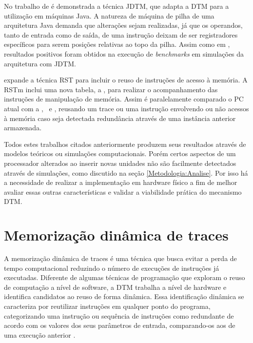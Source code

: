 No trabalho de  é demonstrada a técnica JDTM, que adapta a DTM para a utilização em máquinas Java. A natureza de máquina de pilha de uma arquitetura Java demanda que alterações sejam realizadas, já que os operandos, tanto de entrada como de saída, de uma instrução deixam de ser registradores específicos para serem posições relativas ao topo da pilha. Assim como em , resultados positivos foram obtidos na execução de \textit{benchmarks} em simulações da arquitetura com JDTM.

 expande a técnica RST para incluir o reuso de instruções de acesso à memória. A RSTm inclui uma nova tabela, a \tablel, para realizar o acompanhamento das instruções de manipulação de memória. Assim é paralelamente comparado o PC atual com a \tableg, \tablet\ e \tablel, reusando um trace ou uma instrução envolvendo ou não acessos à memória caso seja detectada redundância através de uma instância anterior armazenada.


Todos estes trabalhos citados anteriormente produzem seus resultados através de modelos teóricos ou simulações computacionais. Porém certos aspectos de um processador alterados ao inserir novas unidades não são facilmente detectados através de simulações, como discutido na seção \ref{Metodologia:Analise}. Por isso há a necessidade de realizar a implementação em hardware físico a fim de melhor avaliar essas outras características e validar a viabilidade prática do mecanismo DTM.

\section{Memorização dinâmica de traces}
\label{Fundamentacao:DTM}

A memorização dinâmica de traces é uma técnica que busca evitar a perda de tempo computacional reduzindo o número de execuções de instruções já executadas. Diferente de algumas técnicas de programação que exploram o reuso de computação a nível de software, a DTM trabalha a nível de hardware e identifica candidatos ao reuso de forma dinâmica. Essa identificação dinâmica se caracteriza por reutilizar instruções em qualquer ponto do programa, categorizando uma instrução ou sequência de instruções como redundante de acordo com os valores dos seus parâmetros de entrada, comparando-os aos de uma execução anterior \cite{costa2001explorando}.

